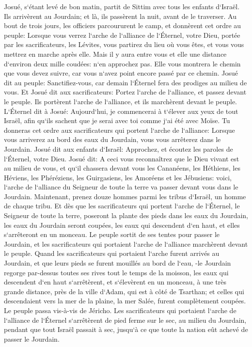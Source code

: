 \verse Josué, s`étant levé de bon matin, partit de Sittim avec tous les enfants d`Israël. Ils arrivèrent au Jourdain; et là, ils passèrent la nuit, avant de le traverser. 
\verse Au bout de trois jours, les officiers parcoururent le camp, 
\verse et donnèrent cet ordre au peuple: Lorsque vous verrez l`arche de l`alliance de l`Éternel, votre Dieu, portée par les sacrificateurs, les Lévites, vous partirez du lieu où vous êtes, et vous vous mettrez en marche après elle. 
\verse Mais il y aura entre vous et elle une distance d`environ deux mille coudées: n`en approchez pas. Elle vous montrera le chemin que vous devez suivre, car vous n`avez point encore passé par ce chemin. 
\verse Josué dit au peuple: Sanctifiez-vous, car demain l`Éternel fera des prodiges au milieu de vous. 
\verse Et Josué dit aux sacrificateurs: Portez l`arche de l`alliance, et passez devant le peuple. Ils portèrent l`arche de l`alliance, et ils marchèrent devant le peuple. 
\verse L`Éternel dit à Josué: Aujourd`hui, je commencerai à t`élever aux yeux de tout Israël, afin qu`ils sachent que je serai avec toi comme j`ai été avec Moïse. 
\verse Tu donneras cet ordre aux sacrificateurs qui portent l`arche de l`alliance: Lorsque vous arriverez au bord des eaux du Jourdain, vous vous arrêterez dans le Jourdain. 
\verse Josué dit aux enfants d`Israël: Approchez, et écoutez les paroles de l`Éternel, votre Dieu. 
\verse Josué dit: A ceci vous reconnaîtrez que le Dieu vivant est au milieu de vous, et qu`il chassera devant vous les Cananéens, les Héthiens, les Héviens, les Phéréziens, les Guirgasiens, les Amoréens et les Jébusiens: 
\verse voici, l`arche de l`alliance du Seigneur de toute la terre va passer devant vous dans le Jourdain. 
\verse Maintenant, prenez douze hommes parmi les tribus d`Israël, un homme de chaque tribu. 
\verse Et dès que les sacrificateurs qui portent l`arche de l`Éternel, le Seigneur de toute la terre, poseront la plante des pieds dans les eaux du Jourdain, les eaux du Jourdain seront coupées, les eaux qui descendent d`en haut, et elles s`arrêteront en un monceau. 
\verse Le peuple sortit de ses tentes pour passer le Jourdain, et les sacrificateurs qui portaient l`arche de l`alliance marchèrent devant le peuple. 
\verse Quand les sacrificateurs qui portaient l`arche furent arrivés au Jourdain, et que leurs pieds se furent mouillés au bord de l`eau, -le Jourdain regorge par-dessus toutes ses rives tout le temps de la moisson, 
\verse les eaux qui descendent d`en haut s`arrêtèrent, et s`élevèrent en un monceau, à une très grande distance, près de la ville d`Adam, qui est à côté de Tsarthan; et celles qui descendaient vers la mer de la plaine, la mer Salée, furent complètement coupées. Le peuple passa vis-à-vis de Jéricho. 
\verse Les sacrificateurs qui portaient l`arche de l`alliance de l`Éternel s`arrêtèrent de pied ferme sur le sec, au milieu du Jourdain, pendant que tout Israël passait à sec, jusqu`à ce que toute la nation eût achevé de passer le Jourdain. 

